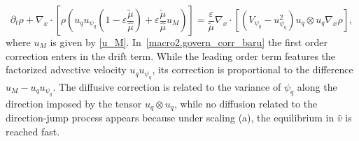 \documentclass[a4paper]{article}
\theoremstyle{Theorem}\newtheorem{proposition}{Proposition}[section]
\theoremstyle{Remark}\newtheorem{remark}{Remark}[section]
\theoremstyle{Theorem}\newtheorem{theorem}{Theorem}[section]
\newcommand{\hv}{\hat{v}}
\newcommand{\hmu}{\hat{\mu}}
\newcommand{\tmu}{\tilde{\mu}}
\begin{document}
\begin{equation}\label{macro2.govern_corr_baru}
    \partial_t \rho +\nabla_x \cdot \left[\rho\left(u_q u_{\psi_q}\left(1-\varepsilon\dfrac{\tmu}{\hmu}\right)+\varepsilon\dfrac{\tmu}{\hmu}u_M\right)\right]=\dfrac{\varepsilon}{\tmu}\nabla_x \cdot \left[(V_{\psi_q}-u_{\psi_q}^2)u_q\otimes u_q\nabla_x \rho\right],
\end{equation}
where $u_M$ is given by \eqref{u_M}. In~\eqref{macro2.govern_corr_baru} the first order correction enters in the drift term. While the leading order term features the factorized advective velocity $u_q u_{\psi_q}$, its correction is proportional to the difference $u_M-u_q u_{\psi_q}$. The diffusive correction is related to the variance of $\psi_q$ along the direction imposed by the tensor $u_q\otimes u_q$, while no diffusion related to the direction-jump process appears because under scaling (a), the equilibrium in $\hv$ is reached fast. %
\end{document}
